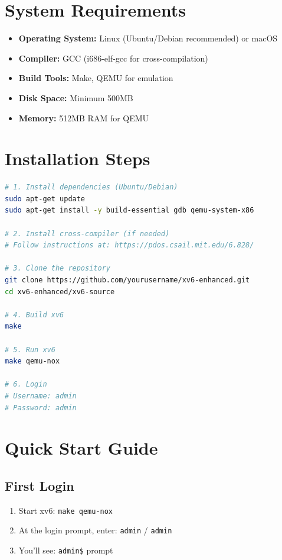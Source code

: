 \documentclass[a4paper,12pt]{report}
\begin{document}
\section{System Requirements}

\begin{itemize}
    \item \textbf{Operating System:} Linux (Ubuntu/Debian recommended) or macOS
    \item \textbf{Compiler:} GCC (i686-elf-gcc for cross-compilation)
    \item \textbf{Build Tools:} Make, QEMU for emulation
    \item \textbf{Disk Space:} Minimum 500MB
    \item \textbf{Memory:} 512MB RAM for QEMU
\end{itemize}

\section{Installation Steps}

\begin{lstlisting}[language=bash, caption=Installation Commands]
# 1. Install dependencies (Ubuntu/Debian)
sudo apt-get update
sudo apt-get install -y build-essential gdb qemu-system-x86

# 2. Install cross-compiler (if needed)
# Follow instructions at: https://pdos.csail.mit.edu/6.828/

# 3. Clone the repository
git clone https://github.com/yourusername/xv6-enhanced.git
cd xv6-enhanced/xv6-source

# 4. Build xv6
make

# 5. Run xv6
make qemu-nox

# 6. Login
# Username: admin
# Password: admin
\end{lstlisting}

\section{Quick Start Guide}

\subsection{First Login}

\begin{enumerate}
    \item Start xv6: \texttt{make qemu-nox}
    \item At the login prompt, enter: \texttt{admin} / \texttt{admin}
    \item You'll see: \texttt{admin\$} prompt
\end{enumerate}
\end{document}

